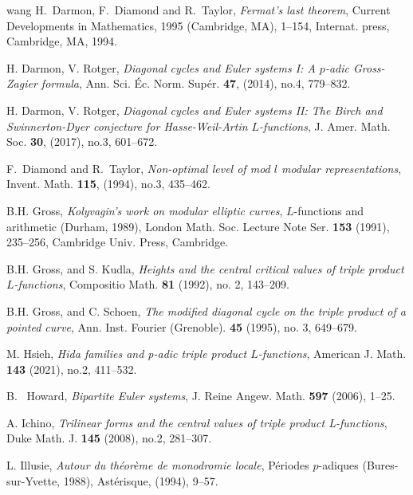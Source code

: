\begin{thebibliography}{wang}
H.~Darmon, F.~Diamond and R.~Taylor, {\em Fermat's last theorem}, Current Developments in Mathematics, 1995 (Cambridge, MA), 1--154, Internat. press, Cambridge, MA, 1994.          

H. Darmon, V. Rotger,
 {\em Diagonal cycles and {E}uler systems {I}: {A} {$p$}-adic
              {G}ross-{Z}agier formula}, Ann. Sci. \'{E}c. Norm. Sup\'{e}r. {\bf 47}, (2014), no.4, 779--832.   
              
H. Darmon, V. Rotger,
 {\em Diagonal cycles and {E}uler systems {II}: {T}he {B}irch and
              {S}winnerton-{D}yer conjecture for {H}asse-{W}eil-{A}rtin
              {$L$}-functions}, J. Amer. Math. Soc. {\bf 30}, (2017), no.3, 601--672.
              
F.~Diamond and R.~Taylor, {\em Non-optimal level of mod $l$ modular representations}, Invent. Math. {\bf 115}, (1994), no.3, 435--462.   

 B.H. Gross, 
{\em Kolyvagin's work on modular elliptic curves}, {$L$}-functions and arithmetic ({D}urham, 1989), London Math. Soc. Lecture Note Ser.
{\bf 153} (1991), 235--256, Cambridge Univ. Press, Cambridge.

 B.H. Gross,  and S. Kudla, 
{\em Heights and the central critical values of triple product
              {$L$}-functions}, Compositio Math. {\bf 81} (1992), no. 2, 143--209. 

 B.H. Gross,  and C. Schoen, 
{\em The modified diagonal cycle on the triple product of a pointed curve}, Ann. Inst. Fourier (Grenoble). {\bf 45} (1995), no. 3, 649--679.
              
M. Hsieh, 
{\em Hida families and p-adic triple product $L$-functions},  American J. Math.  {\bf 143} (2021), no.2, 411--532. 

 B.~ Howard, 
{\em Bipartite Euler systems}, J. Reine Angew. Math. {\bf 597} (2006), 1--25.              
                       
A. Ichino, {\em Trilinear forms and the central values of triple product L-functions}, 
Duke Math. J. {\bf 145} (2008), no.2, 281--307. 
              
L. Illusie, {\em Autour du th\'{e}or\`eme de monodromie locale},  P\'{e}riodes $p$-adiques (Bures-sur-Yvette, 1988), Ast\'{e}risque, (1994), 9--57. 


\end{thebibliography}
